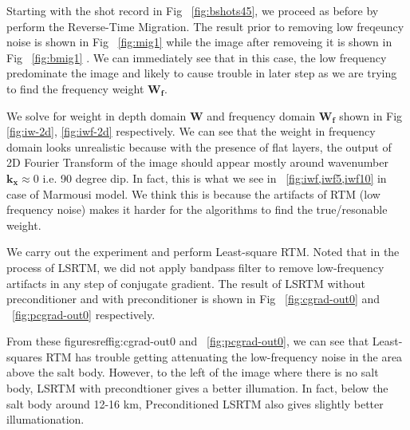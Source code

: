 


Starting with the shot record in Fig ~\ref{fig:bshots45}, we proceed as before by perform the Reverse-Time Migration. The result prior to removing low freqeuncy noise is shown in Fig ~\ref{fig:mig1} while the image after removeing it is shown in Fig ~\ref{fig:bmig1} . We can immediately see that in this case, the low frequency predominate the image and likely to cause trouble in later step as we are trying to find the frequency weight $\mathbf{W_f}$. 


We solve for weight in depth domain $\mathbf{W}$ and frequency domain $\mathbf{W_f}$ shown in Fig \ref{fig:iw-2d}, \ref{fig:iwf-2d} respectively. We can see that the weight in frequency domain looks unrealistic because with the presence of flat layers, the output of 2D Fourier Transform of the image should appear mostly around wavenumber $\mathbf{k_x} \approx 0$ i.e. 90 degree dip. In fact, this is what we see in ~\ref{fig:iwf,iwf5,iwf10} in case of Marmousi model. We think this is because the artifacts of RTM (low frequency noise) makes it harder for the algorithms to find the true/resonable weight.



We carry out the experiment and perform Least-square RTM. Noted that in the process of LSRTM, we did not apply bandpass filter to remove low-frequency artifacts in any step of conjugate gradient. The result of LSRTM without preconditioner and with preconditioner is shown in Fig ~\ref{fig:cgrad-out0} and ~\ref{fig:pcgrad-out0} respectively.


From these figuresref{fig:cgrad-out0} and ~\ref{fig:pcgrad-out0}, we can see that Least-squares RTM has trouble getting attenuating the low-frequency noise in the area above the salt body. However, to the left of the image where there is no salt body, LSRTM with precondtioner gives a better illumation. In fact, below the salt body around 12-16 km, Preconditioned LSRTM also gives slightly better illumationation. 

